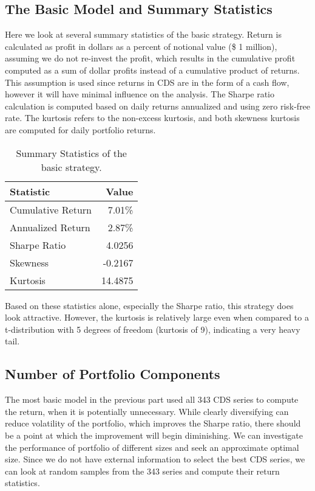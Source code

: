 \documentclass[11pt]{article}
\theoremstyle{definition}
\begin{document}
\subsection{The Basic Model and Summary Statistics}

Here we look at several summary statistics
of the basic strategy.
Return is calculated as profit in dollars as a percent of 
notional value (\$ 1 million), 
assuming we do not re-invest the profit,
which results in the cumulative profit 
computed as a sum of dollar profits 
instead of a cumulative product of returns.
This assumption is used since returns in CDS 
are in the form of a cash flow,
however it will have minimal influence on the analysis.
The Sharpe ratio calculation is computed based on
daily returns annualized and using zero risk-free rate.
The kurtosis refers to the non-excess kurtosis,
and both skewness kurtosis are computed for daily 
portfolio returns.

\begin{table}[h]
\centering
\begin{tabular}{ | l | r | }
  \hline      
  Statistic & Value \\
  \hline
  Cumulative Return & 7.01\% \\
  Annualized Return & 2.87\% \\
  Sharpe Ratio & 4.0256 \\
  Skewness & -0.2167 \\
  Kurtosis & 14.4875 \\
  \hline  
\end{tabular}
\caption{Summary Statistics of the basic strategy.}
\label{tab:basic_summary}
\end{table}

Based on these statistics alone, especially the Sharpe ratio, 
this strategy does look attractive. 
However, the kurtosis is relatively large
even when compared to a t-distribution with 5 degrees of freedom
(kurtosis of 9),
indicating a very heavy tail.

\subsection{Number of Portfolio Components}

The most basic model in the previous part 
used all 343 CDS series to 
compute the return, when it is potentially unnecessary.
While clearly diversifying can reduce volatility 
of the portfolio, which improves the Sharpe ratio,
there should be a point at which the improvement 
will begin diminishing.
We can investigate the performance of portfolio 
of different sizes and seek an approximate 
optimal size.
Since we do not have external information to 
select the best CDS series,
we can look at random samples from the 343 series 
and compute their return statistics.
\end{document}
